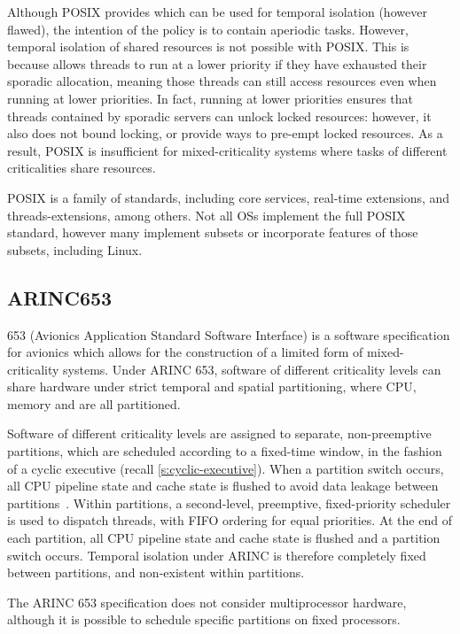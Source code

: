 Although \gls{POSIX} provides \schedsporadic which can be used for temporal isolation (however
flawed), the intention of the policy is to contain aperiodic tasks. 
However, temporal isolation of shared resources is not possible with \gls{POSIX}.
This is because \schedsporadic allows threads to run at a lower priority if 
they have exhausted their sporadic allocation, meaning those threads can still access resources
even when running at lower priorities. In fact, running at lower priorities ensures that threads
contained by sporadic servers can unlock locked resources: however, it also does not bound
locking, or provide ways to pre-empt locked resources.
As a result, \gls{POSIX} is insufficient for
mixed-criticality systems where tasks of different criticalities share resources.  

POSIX is a family of standards, including core services, real-time extensions, and
threads-extensions, among others. 
Not all \glspl{OS} implement the full \gls{POSIX} standard, however many implement subsets or incorporate features of those subsets, including Linux.

\subsection{ARINC653}
\label{s:arinc}

\citet{ARINC653} 653 (Avionics Application Standard Software Interface) is a software specification
for avionics which allows for the construction of a limited form of mixed-criticality systems. Under
ARINC 653, software of different criticality levels can share hardware under strict temporal and
spatial partitioning, where CPU, memory and \IO are all partitioned. 

Software of different criticality levels are assigned to separate, non-preemptive partitions, which
are scheduled according to a fixed-time window, in the fashion of a cyclic executive
(recall \cref{s:cyclic-executive}). When a partition switch occurs, all CPU pipeline state and
cache state is flushed to avoid data leakage between partitions~\citep{VanderLeest_10}. Within partitions,
a second-level, preemptive, fixed-priority scheduler is used to dispatch threads, with \gls{FIFO}
ordering for equal priorities. 
At the end of each partition, all CPU pipeline state and cache
state is flushed and a partition switch occurs. Temporal isolation under ARINC is therefore
completely fixed between partitions, and non-existent within partitions. 

The ARINC 653 specification does not consider multiprocessor hardware, although it is possible to
schedule specific partitions on fixed processors. 

